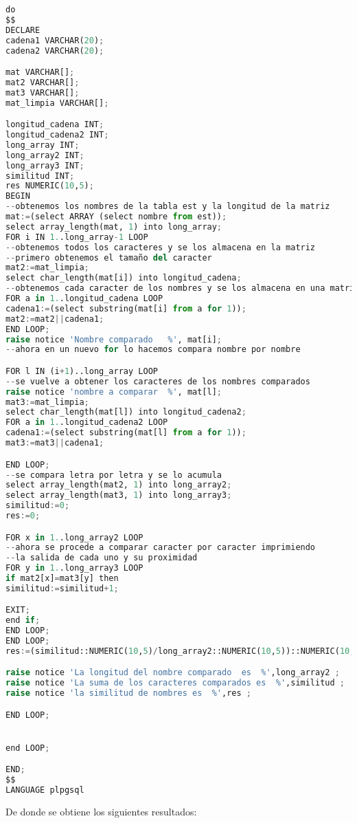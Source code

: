 \begin{lstlisting}[language=python]
do
$$
DECLARE 
cadena1 VARCHAR(20);
cadena2 VARCHAR(20);

mat VARCHAR[];
mat2 VARCHAR[];
mat3 VARCHAR[];
mat_limpia VARCHAR[];

longitud_cadena INT;
longitud_cadena2 INT;
long_array INT;
long_array2 INT;
long_array3 INT;
similitud INT;
res NUMERIC(10,5);
BEGIN
--obtenemos los nombres de la tabla est y la longitud de la matriz
mat:=(select ARRAY (select nombre from est));
select array_length(mat, 1) into long_array;
FOR i IN 1..long_array-1 LOOP
--obtenemos todos los caracteres y se los almacena en la matriz
--primero obtenemos el tamaño del caracter
mat2:=mat_limpia;
select char_length(mat[i]) into longitud_cadena;
--obtenemos cada caracter de los nombres y se los almacena en una matriz
FOR a in 1..longitud_cadena LOOP
cadena1:=(select substring(mat[i] from a for 1));	
mat2:=mat2||cadena1;
END LOOP;
raise notice 'Nombre comparado   %', mat[i];	
--ahora en un nuevo for lo hacemos compara nombre por nombre

FOR l IN (i+1)..long_array LOOP
--se vuelve a obtener los caracteres de los nombres comparados
raise notice 'nombre a comparar  %', mat[l];
mat3:=mat_limpia;
select char_length(mat[l]) into longitud_cadena2;
FOR a in 1..longitud_cadena2 LOOP
cadena1:=(select substring(mat[l] from a for 1));	
mat3:=mat3||cadena1;

END LOOP;
--se compara letra por letra y se lo acumula
select array_length(mat2, 1) into long_array2;
select array_length(mat3, 1) into long_array3;
similitud:=0;
res:=0;

FOR x in 1..long_array2 LOOP
--ahora se procede a comparar caracter por caracter imprimiendo
--la salida de cada uno y su proximidad
FOR y in 1..long_array3 LOOP
if mat2[x]=mat3[y] then
similitud:=similitud+1;	

EXIT;
end if;
END LOOP;
END LOOP;
res:=(similitud::NUMERIC(10,5)/long_array2::NUMERIC(10,5))::NUMERIC(10,5);

raise notice 'La longitud del nombre comparado  es  %',long_array2 ;			
raise notice 'La suma de los caracteres comparados es  %',similitud ;			
raise notice 'la similitud de nombres es  %',res ;			

END LOOP;


end LOOP;

END;
$$
LANGUAGE plpgsql
\end{lstlisting}
De donde se obtiene los siguientes resultados:
